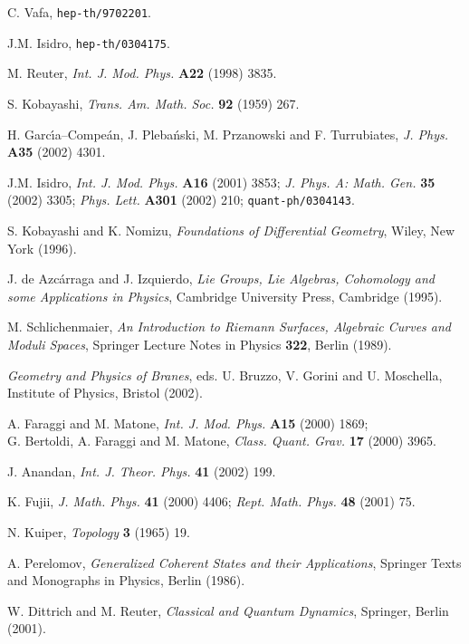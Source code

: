 \documentclass[a4paper,a4paper]{article}
\begin{document}
\begin{thebibliography}{99}


C. Vafa, {\tt hep-th/9702201}.

J.M. Isidro, {\tt hep-th/0304175}.

M. Reuter, {\it Int. J. Mod. Phys.} {\bf A22} (1998) 3835.

S. Kobayashi, {\it Trans. Am. Math. Soc.} {\bf 92} (1959) 267.

H. Garc\'{\i}a--Compe\'an, J. Pleba\'nski, M. Przanowski and F. 
Turrubiates, {\it J. Phys.} {\bf A35} (2002) 4301.

J.M. Isidro, 
{\it Int. J. Mod. Phys.} {\bf A16} (2001) 3853;
{\it  J. Phys. A: Math. Gen.} {\bf 35} (2002) 3305;
{\it Phys. Lett.} {\bf A301} (2002) 210;
{\tt quant-ph/0304143}.

S. Kobayashi and K. Nomizu, {\it Foundations of Differential Geometry}, Wiley, 
New York (1996).

J. de Azc\'arraga and J. Izquierdo, {\it Lie Groups, Lie Algebras, 
Cohomology and some Applications in Physics}, Cambridge University Press, 
Cambridge (1995).

M. Schlichenmaier, {\it An Introduction to Riemann Surfaces, Algebraic Curves 
and Moduli Spaces}, Springer Lecture Notes in Physics {\bf 322}, Berlin (1989).

{\it Geometry and Physics of Branes}, eds. U. Bruzzo, V. Gorini and U. 
Moschella, Institute of Physics, Bristol (2002).

A. Faraggi and M. Matone, {\it Int. J. Mod. Phys.} {\bf A15} (2000) 1869;\\
G. Bertoldi, A. Faraggi and M. Matone, {\it Class. Quant. Grav.} {\bf 17} (2000) 3965.

J. Anandan, {\it Int. J. Theor. Phys.} {\bf 41} (2002) 199.

K. Fujii, {\it J. Math. Phys.} {\bf 41} (2000) 4406; {\it Rept. Math. Phys.} 
{\bf 48} (2001) 75.

N. Kuiper, {\it Topology}\/ {\bf 3} (1965) 19.

A. Perelomov, {\it Generalized Coherent States and their Applications}, Springer Texts and
Monographs in Physics, Berlin (1986).

W. Dittrich and M. Reuter, {\it Classical and Quantum Dynamics}, Springer, 
Berlin (2001).


\end{thebibliography}
\end{document}
